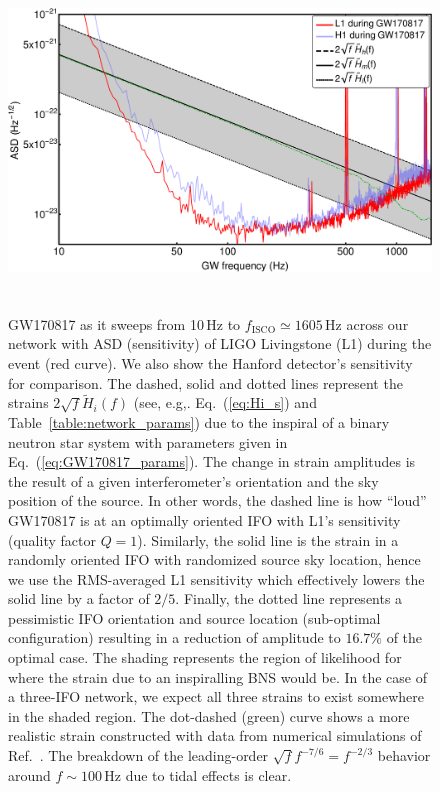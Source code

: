\documentclass[11pt,a4paper]{article}
\begin{document}
\begin{figure}[h!]
\includegraphics[height=9cm]{Figures/GW170817_strains.pdf}
\caption{GW170817 as it sweeps from 10\,Hz to $f_\text{ISCO} \simeq1605\,$Hz across our network with ASD (sensitivity) of LIGO Livingstone (L1) during the event (red curve).
We also show the Hanford detector's sensitivity for comparison. The dashed, solid and dotted lines represent the strains 
$2\sqrt{f} \tilde{H}_i(f)$ (see, e.g,. Eq.~(\ref{eq:Hi_s}) and Table~\ref{table:network_params}) due to the inspiral of
a binary neutron star system with parameters given in Eq.~(\ref{eq:GW170817_params}). The change in strain amplitudes is the result of a
given interferometer's orientation and the sky position of the source. In other words, the dashed line is how ``loud'' GW170817 
is at an optimally oriented IFO with L1's sensitivity
(quality factor $Q=1$). Similarly, the solid line is the strain in a randomly oriented IFO with randomized source sky location, hence
we use the RMS-averaged L1 sensitivity which effectively lowers the solid line by a factor of $2/5$. %
Finally, the dotted line represents a pessimistic IFO orientation and source location (sub-optimal configuration)
resulting in a reduction of amplitude to $ 16.7\%$ of the optimal case. 
The shading represents the region of likelihood for where the strain due to an inspiralling BNS would be. In the case of a three-IFO
network, we expect all three strains to exist somewhere in the shaded region.
The dot-dashed (green) curve shows a more realistic strain constructed with data from numerical simulations of Ref.~\cite{Read:2009yp}.
The breakdown of the leading-order $\sqrt{f}f^{-7/6}=f^{-2/3}$ behavior around $f\sim100\,$Hz due to tidal effects is clear.
}
\label{fig:figGW170817}
\end{figure}
%
%
\end{document}
